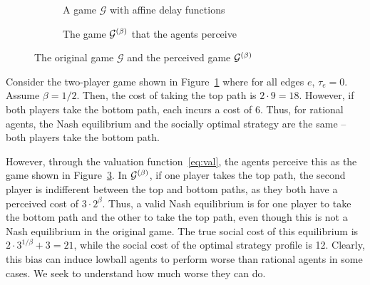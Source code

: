 \documentclass[twoside]{article}
\begin{document}
\begin{multicols}{2}
\begin{figure}[H]
\begin{subfigure}[b]{\linewidth}
    \caption{A game $\mathcal{G}$ with affine delay functions}
    \label{fig:affine}
  \end{subfigure}

  \begin{subfigure}[b]{\linewidth}
    \centering
    \caption{The game $\mathcal{G}^{(\beta)}$ that the agents perceive}
    \label{fig:affinebet}
  \end{subfigure}
  \caption{The original game $\mathcal{G}$ and the perceived game
  $\mathcal{G}^{(\beta)}$}
\end{figure}
Consider the two-player game shown in Figure~\ref{fig:affine} where for all edges $e$, $\tau_e = 0$. Assume $\beta =
1/2$. Then, the cost of taking the top path is $2 \cdot 9 = 18$. However, if
both players take the bottom path, each incurs a cost of 6. Thus, for rational
agents, the Nash equilibrium and the socially optimal strategy are the same --
both players take the bottom path.

However, through the valuation function~\eqref{eq:val}, the agents perceive this
as the game shown in Figure~\ref{fig:affinebet}. In $\mathcal{G}^{(\beta)}$, if one
player takes the top path, the second player is indifferent between the top and
bottom paths, as they both have a perceived cost of $3 \cdot 2^\beta$. Thus, a
valid Nash equilibrium is for one player to take the bottom path and the other
to take the top path, even though this is not a Nash equilibrium in the original
game. The true social cost of this equilibrium is $2 \cdot 3^{1/\beta} + 3 =
21$, while the social cost of the optimal strategy profile is 12. Clearly, this
bias can induce lowball agents to perform worse than rational agents in some
cases. We seek to understand how much worse they can do.


\end{multicols}
\end{document}
